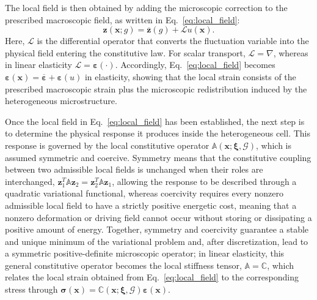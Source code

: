 \documentclass[pdflatex,sn-basic,Numbered]{sn-jnl}
\newcommand{\G}{\mathcal{G}}
\begin{document}
The local field is then obtained by adding the microscopic correction to the
prescribed macroscopic field, as written in Eq.~\eqref{eq:local_field}:
\begin{equation}
\label{eq:local_field}
\boldsymbol z(\boldsymbol x;g)
=
\overline{\boldsymbol z}(g)
+
\mathcal L u(\boldsymbol x).
\end{equation}
Here, \(\mathcal L\) is the differential operator that converts the
fluctuation variable into the physical field entering the constitutive law.
For scalar transport, \(\mathcal L=\nabla\), whereas in linear elasticity
\(\mathcal L=\boldsymbol{\varepsilon}(\cdot)\). Accordingly,
Eq.~\eqref{eq:local_field} becomes
\(\boldsymbol{\varepsilon}(\boldsymbol x)
=
\overline{\boldsymbol{\varepsilon}}
+
\boldsymbol{\varepsilon}(u)\)
in elasticity, showing that the local strain consists of the prescribed
macroscopic strain plus the microscopic redistribution induced by the
heterogeneous microstructure.

Once the local field in Eq.~\eqref{eq:local_field} has been established, the
next step is to determine the physical response it produces inside the
heterogeneous cell. This response is governed by the local constitutive
operator \(\mathbb A(\boldsymbol x;\boldsymbol\xi,\G)\), which is assumed
symmetric and coercive. Symmetry means that the constitutive coupling between
two admissible local fields is unchanged when their roles are interchanged,
\(\boldsymbol z_1^T\mathbb A\boldsymbol z_2
=
\boldsymbol z_2^T\mathbb A\boldsymbol z_1\), allowing the response to be
described through a quadratic variational functional, whereas coercivity
requires every nonzero admissible local field to have a strictly positive
energetic cost, meaning that a nonzero deformation or driving field cannot
occur without storing or dissipating a positive amount of energy. Together,
symmetry and coercivity guarantee a stable and unique minimum of the
variational problem and, after discretization, lead to a symmetric
positive-definite microscopic operator; in linear elasticity, this general
constitutive operator becomes the local stiffness tensor,
\(\mathbb A=\mathbb C\), which relates the local strain obtained from
Eq.~\eqref{eq:local_field} to the corresponding stress through
\(\boldsymbol\sigma(\boldsymbol x)
=
\mathbb C(\boldsymbol x;\boldsymbol\xi,\G)
\boldsymbol\varepsilon(\boldsymbol x)\).
\end{document}
